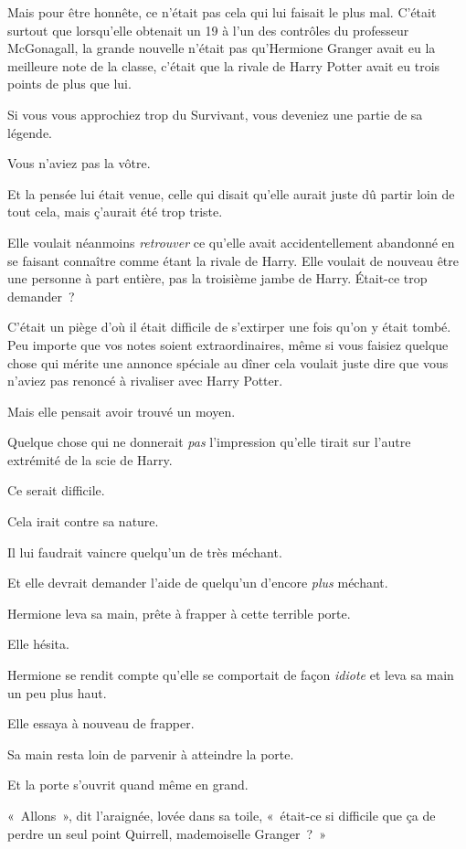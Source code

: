 Mais pour être honnête, ce n'était pas cela qui lui faisait le plus mal. C'était surtout que lorsqu'elle obtenait un 19 à l'un des contrôles du professeur McGonagall, la grande nouvelle n'était pas qu'Hermione Granger avait eu la meilleure note de la classe, c'était que la rivale de Harry Potter avait eu trois points de plus que lui.

Si vous vous approchiez trop du Survivant, vous deveniez une partie de sa légende.

Vous n'aviez pas la vôtre.

Et la pensée lui était venue, celle qui disait qu'elle aurait juste dû partir loin de tout cela, mais ç'aurait été trop triste.

Elle voulait néanmoins \emph{retrouver} ce qu'elle avait accidentellement abandonné en se faisant connaître comme étant la rivale de Harry. Elle voulait de nouveau être une personne à part entière, pas la troisième jambe de Harry. Était-ce trop demander~?

C'était un piège d'où il était difficile de s'extirper une fois qu'on y était tombé. Peu importe que vos notes soient extraordinaires, même si vous faisiez quelque chose qui mérite une annonce spéciale au dîner cela voulait juste dire que vous n'aviez pas renoncé à rivaliser avec Harry Potter.

Mais elle pensait avoir trouvé un moyen.

Quelque chose qui ne donnerait \emph{pas} l'impression qu'elle tirait sur l'autre extrémité de la scie de Harry.

Ce serait difficile.

Cela irait contre sa nature.

Il lui faudrait vaincre quelqu'un de très méchant.

Et elle devrait demander l'aide de quelqu'un d'encore \emph{plus} méchant.

Hermione leva sa main, prête à frapper à cette terrible porte.

Elle hésita.

Hermione se rendit compte qu'elle se comportait de façon \emph{idiote} et leva sa main un peu plus haut.

Elle essaya à nouveau de frapper.

Sa main resta loin de parvenir à atteindre la porte.

Et la porte s'ouvrit quand même en grand.

«~Allons~», dit l'araignée, lovée dans sa toile, «~était-ce si difficile que ça de perdre un seul point Quirrell, mademoiselle Granger~?~»

